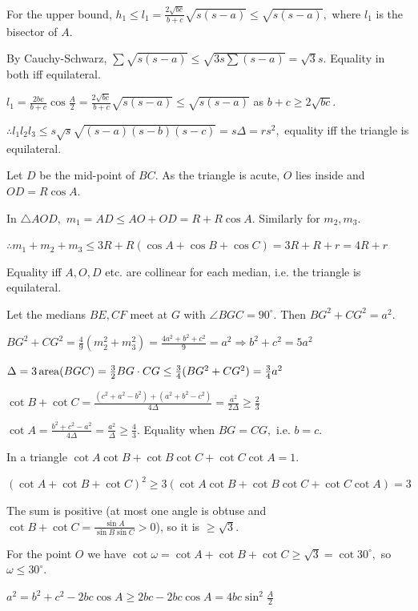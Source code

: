   For the upper bound, $h_1\leq l_1 = \frac{2\sqrt{bc}}{b + c}\sqrt{s(s - a)}\leq \sqrt{s(s - a)},$ where $l_1$ is the
  bisector of $A.$

  By Cauchy-Schwarz, $\sum\sqrt{s(s - a)}\leq \sqrt{3s\sum(s - a)} = \sqrt{3}s.$ Equality in both iff equilateral.
\item $l_1 = \frac{2bc}{b + c}\cos\frac{A}{2} = \frac{2\sqrt{bc}}{b + c}\sqrt{s(s - a)}\leq \sqrt{s(s - a)}$ as $b + c\geq
  2\sqrt{bc}.$

  $\therefore l_1l_2l_3\leq s\sqrt{s}\sqrt{(s - a)(s - b)(s - c)} = s\Delta = rs^2,$ equality iff the triangle is equilateral.
\item Let $D$ be the mid-point of $BC.$ As the triangle is acute, $O$ lies inside and $OD = R\cos A.$

  In $\triangle AOD,$ $m_1 = AD\leq AO + OD = R + R\cos A.$ Similarly for $m_2, m_3.$

  $\therefore m_1 + m_2 + m_3\leq 3R + R(\cos A + \cos B + \cos C) = 3R + R + r = 4R + r$

  Equality iff $A, O, D$ etc. are collinear for each median, i.e. the triangle is equilateral.
\item Let the medians $BE, CF$ meet at $G$ with $\angle BGC = 90^\circ.$ Then $BG^2 + CG^2 = a^2.$

  $BG^2 + CG^2 = \frac{4}{9}(m_2^2 + m_3^2) = \frac{4a^2 + b^2 + c^2}{9} = a^2\Rightarrow b^2 + c^2 = 5a^2$

  $\Delta = 3\,{\rm area}(BGC) = \frac{3}{2}BG\cdot CG\leq \frac{3}{4}(BG^2 + CG^2) = \frac{3}{4}a^2$

  $\cot B + \cot C = \frac{(c^2 + a^2 - b^2) + (a^2 + b^2 - c^2)}{4\Delta} = \frac{a^2}{2\Delta}\geq \frac{2}{3}$

  $\cot A = \frac{b^2 + c^2 - a^2}{4\Delta} = \frac{a^2}{\Delta}\geq \frac{4}{3}.$ Equality when $BG = CG,$ i.e. $b = c.$
\item In a triangle $\cot A\cot B + \cot B\cot C + \cot C\cot A = 1.$

  $(\cot A + \cot B + \cot C)^2\geq 3(\cot A\cot B + \cot B\cot C + \cot C\cot A) = 3$

  The sum is positive (at most one angle is obtuse and $\cot B + \cot C = \frac{\sin A}{\sin B\sin C} > 0$), so it is $\geq
  \sqrt{3}.$

  For the point $O$ we have $\cot\omega = \cot A + \cot B + \cot C\geq \sqrt{3} = \cot 30^\circ,$ so $\omega\leq 30^\circ.$
\item $a^2 = b^2 + c^2 - 2bc\cos A\geq 2bc - 2bc\cos A = 4bc\sin^2\frac{A}{2}$

